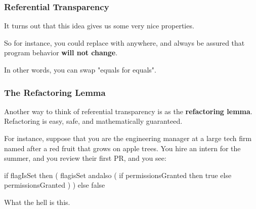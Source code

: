 \documentclass[aspectratio=169]{beamer}
\begin{document}
\begin{frame}[fragile]
  \frametitle{Referential Transparency}

  \ptmt

  It turns out that this idea gives us some very nice properties.

  \pause
  \vspace{\fill}


  \pause
  \vspace{\fill}

  So for instance, you could replace  with  anywhere, and always
  be assured that program behavior \textbf{will not change}.
  
  \pause
  \vspace{5pt}

  In other words, you can swap "equals for equals".

  \pause
  \vspace{\fill}

\end{frame}

\begin{frame}[fragile]
  \frametitle{The Refactoring Lemma}

  Another way to think of referential transparency is as the
  \textbf{refactoring lemma}. Refactoring is easy, safe, and 
  mathematically guaranteed. 

  \pause
  \vspace{\fill}

  For instance, suppose that you are the engineering manager at a large
  tech firm named after a red fruit that grows on apple trees. You
  hire an intern for the summer, and you review their first PR, and you
  see: 

  \pause
  \begin{codeblock}
    if flagIsSet then (
      flagisSet andalso ( 
        if permissionsGranted then
          true
        else
          permissionsGranted 
      )
    ) else false
  \end{codeblock}

  \pause
  \vspace{\fill}

  What the hell is this.
\end{frame}
\end{document}

